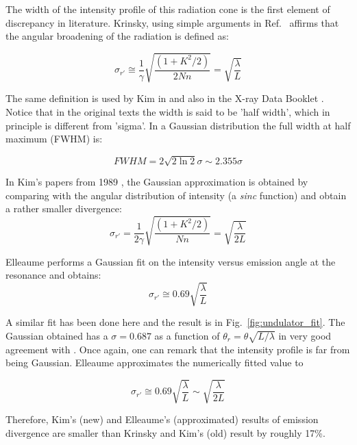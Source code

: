 \documentclass{iucr}              %
\begin{document}
The width of the intensity profile of this radiation cone is the first element of discrepancy in literature. Krinsky, using simple arguments in Ref.~\cite{krinsky} affirms that the angular broadening of the radiation is defined as: 

\begin{equation}
\sigma_{r\prime} \cong \frac{1}{\gamma}\sqrt{ \frac{(1+K^2/2)}{2Nn}}=\sqrt{\frac{\lambda}{L} }
\label{kim_sigmaprime}
\end{equation}

The same definition is used by Kim in \cite{kim1986a,kim1986b} and also in the X-ray Data Booklet \cite{xraydatabooklet}. Notice that in the original texts the width is said to be 'half width', which in principle is different from 'sigma'.  In a Gaussian distribution the full width at half maximum (FWHM) is:

\begin{equation}
FWHM=2 \sqrt{2 \ln 2} \sigma \sim 2.355 \sigma
\end{equation}

In Kim's papers from 1989 \cite{kim1989}, the Gaussian approximation is obtained by comparing with the angular distribution of intensity (a {\it sinc} function) and obtain a rather smaller divergence:
\begin{equation}
\sigma_{r\prime} = \frac{1}{2\gamma}\sqrt{ \frac{(1+K^2/2)}{Nn}}=\sqrt{\frac{\lambda}{2L} }
\label{kimnew_sigmaprime}
\end{equation}


Elleaume \cite{elleaume} performs a Gaussian fit on the intensity versus emission angle at the resonance and obtains: 
\begin{equation}
\sigma_{r'} \cong 0.69 \sqrt{\frac{\lambda}{L}}
\label{elleaume_sigmaprime}
\end{equation}

A similar fit has been done here and the result is in Fig.~\ref{fig:undulator_fit}. The Gaussian obtained has a $\sigma=0.687$ as a function of $\theta_r=\theta\sqrt{L/\lambda}$ in very good agreement with \cite{elleaume}. Once again, one can remark that the intensity profile is far from being Gaussian. Elleaume approximates the numerically fitted value to 

\begin{equation}
\sigma_{r'} \cong 0.69 \sqrt{\frac{\lambda}{L}} \sim \sqrt{\frac{\lambda}{2L}} 
\label{elleaume_sigmaprimeapprox}
\end{equation}

Therefore, Kim's (new) and Elleaume's (approximated) results of emission divergence are smaller than Krinsky and Kim's (old) result by roughly 17\%.
\end{document}
